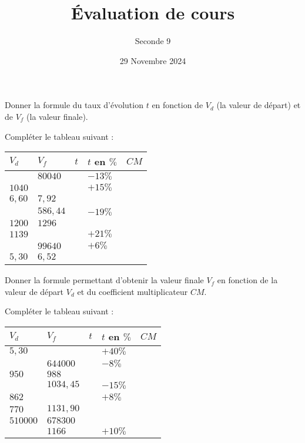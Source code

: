 \documentclass{exam}
\title{Évaluation de cours}
\date{29 Novembre 2024}
\author{Seconde 9}
\begin{document}
\maketitle

\begin{questions}
\question
Donner la formule du taux d'évolution $t$ en fonction de $V_d$ (la valeur de départ) et de $V_f$ (la valeur finale).
\vspace*{0.5cm}

\emptybox{3cm}

\vspace*{0.5cm}
\question Compléter le tableau suivant :
\begin{center}
\renewcommand{\arraystretch}{2}
\begin{tabular}{|p{3cm}|p{3cm}|p{3cm}|p{3cm}|p{3cm}|}
\hline
$V_d$ & $V_f$ & $t$ & $t$ en $\%$ & $CM$\\
\hline
    & $80040$ & & $-13\%$ & \\
\hline
$1040$ & & & $+15\%$ & \\
\hline
$6,60$ & $7,92$ & & & \\
\hline
 & $586,44$ & & $-19\%$ & \\
\hline
$1200$ & $1296$ & & & \\
\hline
$1139$ & & & $+21\%$ & \\
\hline
 & $99640$ & & $+6\%$ & \\
\hline
$5,30$ & $6,52$ & & & \\
\hline
\end{tabular}
\end{center}
\end{questions}
\newpage
\maketitle

\begin{questions}
\question
Donner la formule permettant d'obtenir la valeur finale $V_f$ en fonction de la valeur de départ $V_d$ et du coefficient multiplicateur $CM$.
\vspace*{0.5cm}

\emptybox{3cm}

\vspace*{0.5cm}
\question Compléter le tableau suivant :
\begin{center}
\renewcommand{\arraystretch}{2}
\begin{tabular}{|p{3cm}|p{3cm}|p{3cm}|p{3cm}|p{3cm}|}
\hline
$V_d$ & $V_f$ & $t$ & $t$ en $\%$ & $CM$\\
\hline
$5,30$ & & & $+40\%$ & \\
\hline
 & $644000$ & & $-8\%$ & \\
\hline
$950$ & $988$ & & & \\
\hline
 & $1034,45$ & & $-15\%$ & \\
\hline
$862$ & & & $+8\%$ & \\
\hline
$770$ & $1131,90$ & & & \\
\hline
$510000$ & $678300$ & & & \\
\hline
 & $1166$ & & $+10\%$ & \\
\hline
\end{tabular}
\end{center}
\end{questions}
\end{document}
